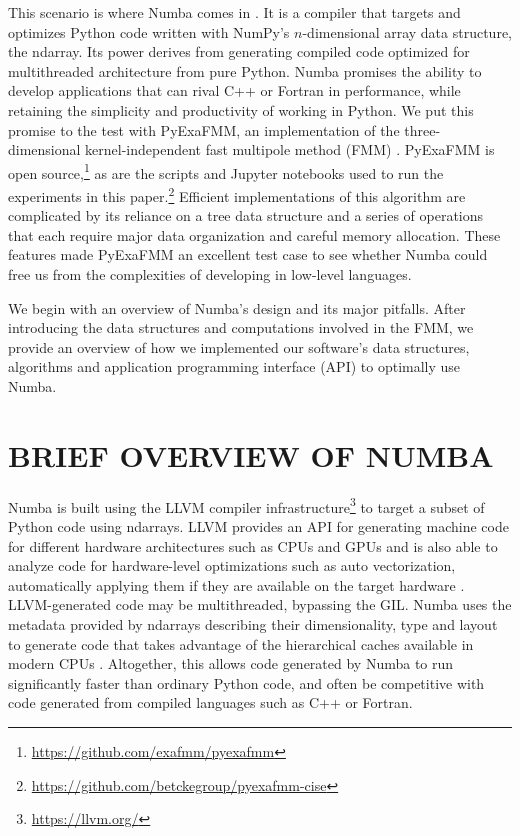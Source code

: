 \documentclass{IEEEcsmag}
\begin{document}
This scenario is where Numba comes in \cite{Lam2015}. It is a compiler that targets and optimizes Python code written with NumPy's $n$-dimensional array data structure, the ndarray. Its power derives from generating  compiled code optimized for multithreaded architecture from pure Python. Numba promises the ability to develop applications that can rival C++ or Fortran in performance, while retaining the simplicity and productivity of working in Python. We put this promise to the test with PyExaFMM, an implementation of the three-dimensional kernel-independent fast multipole method (FMM) \cite{Ying2004,Greengard1987}. PyExaFMM is open source,\footnote{\url{https://github.com/exafmm/pyexafmm}} as are the scripts and Jupyter notebooks used to run the experiments in this paper.\footnote{\url{https://github.com/betckegroup/pyexafmm-cise}} Efficient implementations of this algorithm are complicated by its reliance on a tree data structure and a series of operations that each require major data organization and careful memory allocation. These features made PyExaFMM an excellent test case to see whether Numba could free us from the complexities of developing in low-level languages.

We begin with an overview of Numba's design and its major pitfalls. After introducing the data structures and computations involved in the FMM, we provide an overview of how we implemented our software's data structures, algorithms and application programming interface (API) to optimally use Numba.

\section{BRIEF OVERVIEW OF NUMBA}

Numba is built using the LLVM compiler infrastructure\footnote{\url{https://llvm.org/}} to target a subset of Python code using ndarrays. LLVM provides an API for generating machine code for different hardware architectures such as CPUs and GPUs and is also able to analyze code for hardware-level optimizations such as auto vectorization, automatically applying them if they are available on the target hardware \cite{Lattner2004}. LLVM-generated code may be multithreaded, bypassing the GIL.  Numba uses the metadata provided by ndarrays describing their dimensionality, type and layout to generate code that takes advantage of the hierarchical caches available in modern CPUs \cite{Lam2015}. Altogether, this allows code generated by Numba to run significantly faster than ordinary Python code, and often be competitive with code generated from compiled languages such as C++ or Fortran. 
\end{document}
